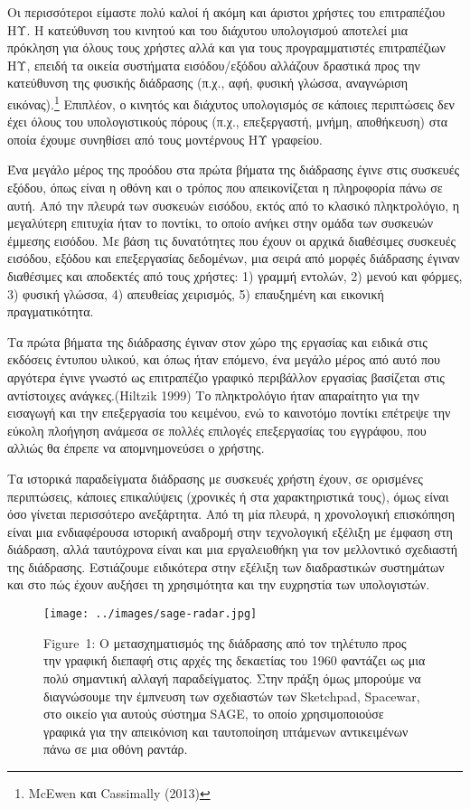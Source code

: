 \documentclass[
]{article}
\begin{document}
Οι περισσότεροι είμαστε πολύ καλοί ή ακόμη και άριστοι χρήστες του
επιτραπέζιου ΗΥ. Η κατεύθυνση του κινητού και του διάχυτου υπολογισμού
αποτελεί μια πρόκληση για όλους τους χρήστες αλλά και για τους
προγραμματιστές επιτραπέζιων ΗΥ, επειδή τα οικεία συστήματα
εισόδου/εξόδου αλλάζουν δραστικά προς την κατεύθυνση της φυσικής
διάδρασης (π.χ., αφή, φυσική γλώσσα, αναγνώριση εικόνας).\footnote{McEwen
  και Cassimally (2013)} Επιπλέον, ο κινητός και διάχυτος υπολογισμός σε
κάποιες περιπτώσεις δεν έχει όλους του υπολογιστικούς πόρους (π.χ.,
επεξεργαστή, μνήμη, αποθήκευση) στα οποία έχουμε συνηθίσει από τους
μοντέρνους ΗΥ γραφείου.

Ένα μεγάλο μέρος της προόδου στα πρώτα βήματα της διάδρασης έγινε στις
συσκευές εξόδου, όπως είναι η οθόνη και ο τρόπος που απεικονίζεται η
πληροφορία πάνω σε αυτή. Από την πλευρά των συσκευών εισόδου, εκτός από
το κλασικό πληκτρολόγιο, η μεγαλύτερη επιτυχία ήταν το ποντίκι, το οποίο
ανήκει στην ομάδα των συσκευών έμμεσης εισόδου. Με βάση τις δυνατότητες
που έχουν οι αρχικά διαθέσιμες συσκευές εισόδου, εξόδου και επεξεργασίας
δεδομένων, μια σειρά από μορφές διάδρασης έγιναν διαθέσιμες και
αποδεκτές από τους χρήστες: 1) γραμμή εντολών, 2) μενού και φόρμες, 3)
φυσική γλώσσα, 4) απευθείας χειρισμός, 5) επαυξημένη και εικονική
πραγματικότητα.

Τα πρώτα βήματα της διάδρασης έγιναν στον χώρο της εργασίας και ειδικά
στις εκδόσεις έντυπου υλικού, και όπως ήταν επόμενο, ένα μεγάλο μέρος
από αυτό που αργότερα έγινε γνωστό ως επιτραπέζιο γραφικό περιβάλλον
εργασίας βασίζεται στις αντίστοιχες ανάγκες.(Hiltzik 1999) Το
πληκτρολόγιο ήταν απαραίτητο για την εισαγωγή και την επεξεργασία του
κειμένου, ενώ το καινοτόμο ποντίκι επέτρεψε την εύκολη πλοήγηση ανάμεσα
σε πολλές επιλογές επεξεργασίας του εγγράφου, που αλλιώς θα έπρεπε να
απομνημονεύσει ο χρήστης.

Τα ιστορικά παραδείγματα διάδρασης με συσκευές χρήστη έχουν, σε
ορισμένες περιπτώσεις, κάποιες επικαλύψεις (χρονικές ή στα
χαρακτηριστικά τους), όμως είναι όσο γίνεται περισσότερο ανεξάρτητα. Από
τη μία πλευρά, η χρονολογική επισκόπηση είναι μια ενδιαφέρουσα ιστορική
αναδρομή στην τεχνολογική εξέλιξη με έμφαση στη διάδραση, αλλά
ταυτόχρονα είναι και μια εργαλειοθήκη για τον μελλοντικό σχεδιαστή της
διάδρασης. Εστιάζουμε ειδικότερα στην εξέλιξη των διαδραστικών
συστημάτων και στο πώς έχουν αυξήσει τη χρησιμότητα και την ευχρηστία
των υπολογιστών.

\leavevmode{}%
\begin{figure}
\hypertarget{fig:sage-radar}{%
\centering
\texttt{[image: ../images/sage-radar.jpg]}
\caption{Figure~1: Ο μετασχηματισμός της διάδρασης από τον τηλέτυπο προς
την γραφική διεπαφή στις αρχές της δεκαετίας του 1960 φαντάζει ως μια
πολύ σημαντική αλλαγή παραδείγματος. Στην πράξη όμως μπορούμε να
διαγνώσουμε την έμπνευση των σχεδιαστών των Sketchpad, Spacewar, στο
οικείο για αυτούς σύστημα SAGE, το οποίο χρησιμοποιούσε γραφικά για την
απεικόνιση και ταυτοποίηση ιπτάμενων αντικειμένων πάνω σε μια οθόνη
ραντάρ.}\label{fig:sage-radar}
}
\end{figure}
\end{document}
